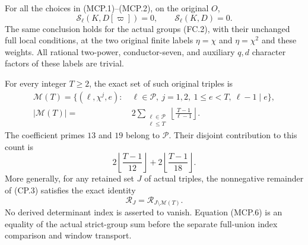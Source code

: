\begin{theorem}
\label{AC-G203}
For all the choices in (MCP.1)--(MCP.2), on the original $O$,
\[
                \mathcal S_\ell(K,D[\varpi])=0,
                \qquad \mathcal S_\ell(K,D)=0.
 \tag{MCP.3}
\]
The same conclusion holds for the actual groups (FC.2), with
their unchanged full local conditions, at the two original
finite labels $\eta=\chi$ and $\eta=\chi^2$ and these weights.
All rational two-power, conductor-seven, and auxiliary $q,d$
character factors of these labels are trivial.

For every integer $T\geq2$, the exact set of such original triples is
\[
 \begin{split}
 \mathcal M(T)=\{(\ell,\chi^j,e):\ &\ell\in\mathscr P,
     \ j=1,2,\ 1\leq e<T,\ \ell-1\mid e\},\\
 |\mathcal M(T)|={}&2\sum_{\substack{\ell\in\mathscr P\\\ell\leq T}}
                  \left\lfloor\frac{T-1}{\ell-1}\right\rfloor.
 \end{split}
 \tag{MCP.4}
\]
The coefficient primes $13$ and $19$ belong to $\mathscr P$.
Their disjoint contribution to this count is
\[
 2\left\lfloor\frac{T-1}{12}\right\rfloor
       +2\left\lfloor\frac{T-1}{18}\right\rfloor.
 \tag{MCP.5}
\]
More generally, for any retained set $J$ of actual triples,
the nonnegative remainder of (CP.3) satisfies the exact identity
\[
                       \mathcal R_J
                          =\mathcal R_{J\setminus\mathcal M(T)}.
 \tag{MCP.6}
\]
No derived determinant index is asserted to vanish.  Equation
(MCP.6) is an equality of the actual strict-group sum before
the separate full-union index comparison and window transport.
\end{theorem}

